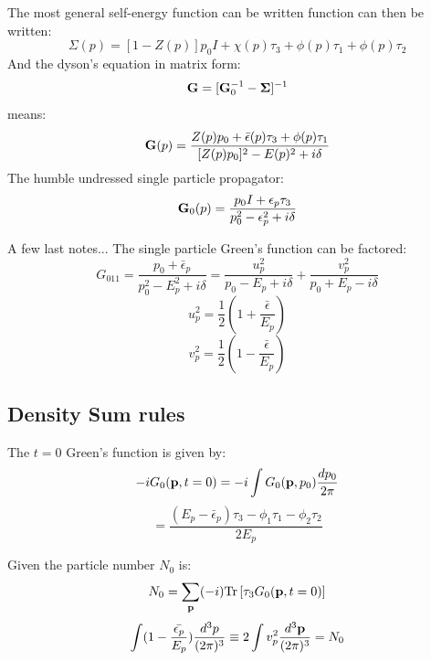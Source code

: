 The most general self-energy function can be written function can then be written:
%
\begin{equation}
\Sigma(p) = [1-Z(p)]p_{0}I + \chi(p)\tau_{3} + \phi(p)\tau_{1} + \phi(p)\tau_{2}
\end{equation}
%
And the dyson's equation in matrix form:
%
\begin{equation}
{\bf G} = [{\bf G}_0^{-1} - \mathbf{\Sigma}]^{-1}
\end{equation}
%
means:
%
\begin{equation}
{\bf G}(p) = \frac{Z(p)p_{0}+\bar{\epsilon}(p)\tau_{3}+\phi(p)\tau_{1}}{[Z(p)p_{0}]^{2} - E(p)^{2} + i\delta}
\end{equation}
%
The humble undressed single particle propagator:
%
\begin{equation}
{\bf G}_{0}(p) = \frac{p_{0}I + \epsilon_{p}\tau_{3}}{p^{2}_{0} - \epsilon^{2}_{p} + i\delta}
\end{equation}

A few last notes... The single particle Green's function can be factored:
%
\begin{equation}
G_{011} =  \frac{p_{0} + \bar{\epsilon}_{p}}{p_{0}^{2} - E_{p}^{2} + i\delta} = 
\frac{u_{p}^{2}}{p_{0} - E_{p} + i\delta} + \frac{v_{p}^{2}}{p_{0} + E_{p} - i\delta}
\end{equation}
%
\begin{equation}
u_{p}^{2} = \frac{1}{2}(1 + \frac{\bar{\epsilon}}{E_{p}})
\end{equation}
%
\begin{equation}
v_{p}^{2} = \frac{1}{2}(1 - \frac{\bar{\epsilon}}{E_{p}})
\end{equation}

\subsection{Density Sum rules}
The $t=0$ Green's function is given by:
%
\begin{equation} 
-iG_{0}({\bf p} , t=0) =  -i\int G_{0}({\bf p},p_{0}) \frac{d p_{0}}{2\pi}
\end{equation}
%
\begin{equation} 
\label{eq:gred}
= \frac{ (E_{p} - \bar{\epsilon}_{p})\tau_{3} - \phi_{1}\tau_{1} - \phi_{2}\tau_{2}}{2E_{p}}
\end{equation}

Given the particle number $N_{0}$ is:
%
\begin{equation}
N_{0} = \sum_{{\bf p}} (-i) {\rm Tr}\left[\tau_{3}G_{0}({\bf p}, t=0)\right]
\end{equation}
%
\begin{equation}
\int(1- \frac{\bar{\epsilon_{p}}}{E_{p}})\frac{d^{3}p}{(2\pi)^{3}} 
\equiv 2\int v_{p}^{2}\frac{d^{3}{\bf p}}{(2\pi)^{3}} = N_{0}
\end{equation}


